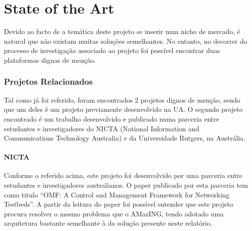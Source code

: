 \chapter{State of the Art}
Devido ao facto de a temática deste projeto se inserir num nicho de mercado, é natural que não existam muitas soluções semelhantes. No entanto, no decorrer do processo de investigação associado ao projeto foi possível encontrar duas plataformas dignas de menção.

\subsection{Projetos Relacionados}
Tal como já foi referido, foram encontrados 2 projetos dignos de menção, sendo que um deles é um projeto previamente desenvolvido na UA. O segundo projeto encontrado é um trabalho desenvolvido e publicado numa parceria entre estudantes e investigadores do NICTA (National Information and Communications Technology Australia) e da Universidade Rutgers, na Austrália.

\subsubsection{NICTA}
Conforme o referido acima, este projeto foi desenvolvido por uma parceria entre estudantes e investigadores australianos. O paper publicado por esta parceria tem como titulo “OMF: A Control and Management Framework for Networking Testbeds”. A partir da leitura do paper foi possível entender que este projeto procura resolver o mesmo problema que o AMazING, tendo adotado uma arquitetura bastante semelhante à da solução presente neste relatório.\cite{nicta}

